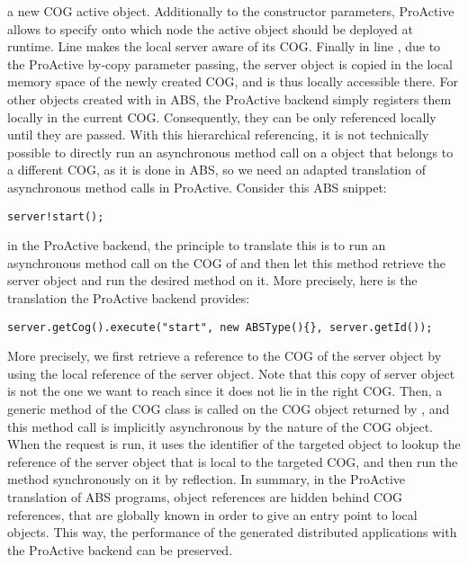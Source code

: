 a new COG active object. Additionally to the constructor parameters, ProActive allows to
 specify onto which node the active object should be deployed at runtime.
Line  makes the local server aware of its COG.
Finally in line , due to the ProActive by-copy parameter passing, the server object is copied in the local memory space of the newly created COG, and is thus locally accessible there.  
For other objects created with  in ABS, the ProActive backend simply registers them locally in the current COG. Consequently, they can be only referenced locally until they are passed.
With this hierarchical referencing,
it is not technically possible to directly run an asynchronous method call on a object that belongs to a different COG, as it is done in ABS, so we need an adapted translation of asynchronous method calls in ProActive.
Consider this ABS snippet:
\begin{lstlisting}
server!start();
\end{lstlisting}
in the ProActive backend, the principle to translate this is to run an asynchronous method call on the COG of  and then let this method retrieve the server object and run the desired method on it.
More precisely, here is the translation the ProActive backend provides:
\begin{lstlisting}
server.getCog().execute("start", new ABSType(){}, server.getId());
\end{lstlisting}
More precisely, we first retrieve a reference to the COG of the server object by using the local reference of the server object. Note that this copy of server object is not the one we want to reach since it does not lie in the right COG. 
Then, a generic  method of the COG class is called on the COG object returned by , and this method call is implicitly asynchronous by the nature of the COG object. When the  request is run, it uses the identifier of the targeted object to lookup the reference of the server object that is local to the targeted COG, and then run the  method synchronously on it by reflection. 
In summary, in the ProActive translation of ABS programs, object references are hidden behind COG references, that are globally known in order to give an entry point to local objects. This way, the performance of the generated distributed applications with the ProActive backend can be preserved.


